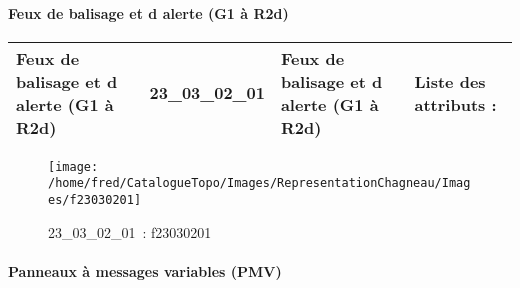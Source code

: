 \documentclass[12pt,titlepage]{book}
\begin{document}
\paragraph{Feux de balisage et d alerte (G1 à R2d)}
\noindent
\vspace{\baselineskip}

\renewcommand{\arraystretch}{1.2}
\begin{supertabular}{|p{10cm}|c|p{13cm}|p{12cm}|}
 Feux de balisage et d alerte (G1 à R2d) & 23\_03\_02\_01 & Feux de balisage et d alerte (G1 à R2d) & Liste des attributs :
\begin{enumerate}
\end{enumerate}
\\
\hline
\end{supertabular}
\begin{figure}[h!]
  \hfill         %
  \begin{minipage}[t]{3cm}
    \begin{center}
      \texttt{[image: /home/fred/CatalogueTopo/Images/RepresentationChagneau/Images/f23030201]}
      \caption[~23\_03\_02\_01]{\small{23\_03\_02\_01~:} \tiny{f23030201}}\label{f23030201}
    \end{center}
  \end{minipage}
\end{figure}


\paragraph{Panneaux à messages variables (PMV)}
\noindent
\vspace{\baselineskip}
\end{document}
